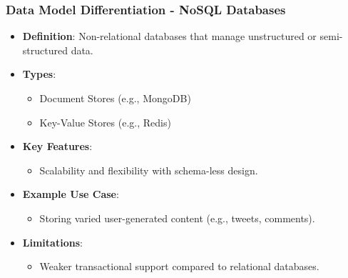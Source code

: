 \documentclass[aspectratio=169]{beamer}
\begin{document}
\begin{frame}[fragile]
    \frametitle{Data Model Differentiation - NoSQL Databases}
    \begin{itemize}
        \item \textbf{Definition}: Non-relational databases that manage unstructured or semi-structured data.
        \item \textbf{Types}:
            \begin{itemize}
                \item Document Stores (e.g., MongoDB)
                \item Key-Value Stores (e.g., Redis)
            \end{itemize}
        \item \textbf{Key Features}:
            \begin{itemize}
                \item Scalability and flexibility with schema-less design.
            \end{itemize}
        \item \textbf{Example Use Case}: 
            \begin{itemize}
                \item Storing varied user-generated content (e.g., tweets, comments).
            \end{itemize}
        \item \textbf{Limitations}:
            \begin{itemize}
                \item Weaker transactional support compared to relational databases.
            \end{itemize}
    \end{itemize}
\end{frame}
\end{document}
